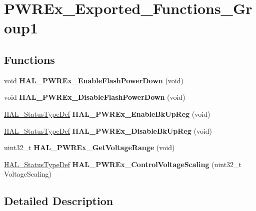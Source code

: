 \hypertarget{group___p_w_r_ex___exported___functions___group1}{}\section{P\+W\+R\+Ex\+\_\+\+Exported\+\_\+\+Functions\+\_\+\+Group1}
\label{group___p_w_r_ex___exported___functions___group1}
\subsection*{Functions}
\begin{DoxyCompactItemize}
\item 
\mbox{\label{group___p_w_r_ex___exported___functions___group1_ga86c72a23f89c3c335ab784f42536b106}} 
void {\bfseries H\+A\+L\+\_\+\+P\+W\+R\+Ex\+\_\+\+Enable\+Flash\+Power\+Down} (void)
\item 
\mbox{\label{group___p_w_r_ex___exported___functions___group1_ga12385932ad48ece7fde94d5c3db5cd19}} 
void {\bfseries H\+A\+L\+\_\+\+P\+W\+R\+Ex\+\_\+\+Disable\+Flash\+Power\+Down} (void)
\item 
\mbox{\label{group___p_w_r_ex___exported___functions___group1_ga21165778ccc2144040c6a935c9f794a7}} 
\hyperlink{stm32f4xx__hal__def_8h_a63c0679d1cb8b8c684fbb0632743478f}{H\+A\+L\+\_\+\+Status\+Type\+Def} {\bfseries H\+A\+L\+\_\+\+P\+W\+R\+Ex\+\_\+\+Enable\+Bk\+Up\+Reg} (void)
\item 
\mbox{\label{group___p_w_r_ex___exported___functions___group1_gae1b50407389e3ce1132eceb013f823d1}} 
\hyperlink{stm32f4xx__hal__def_8h_a63c0679d1cb8b8c684fbb0632743478f}{H\+A\+L\+\_\+\+Status\+Type\+Def} {\bfseries H\+A\+L\+\_\+\+P\+W\+R\+Ex\+\_\+\+Disable\+Bk\+Up\+Reg} (void)
\item 
\mbox{\label{group___p_w_r_ex___exported___functions___group1_ga2978c7160c8d166f1bf2bf39e4bf33f7}} 
uint32\+\_\+t {\bfseries H\+A\+L\+\_\+\+P\+W\+R\+Ex\+\_\+\+Get\+Voltage\+Range} (void)
\item 
\mbox{\label{group___p_w_r_ex___exported___functions___group1_ga1a1e616641c2dc696681ace585d9afb5}} 
\hyperlink{stm32f4xx__hal__def_8h_a63c0679d1cb8b8c684fbb0632743478f}{H\+A\+L\+\_\+\+Status\+Type\+Def} {\bfseries H\+A\+L\+\_\+\+P\+W\+R\+Ex\+\_\+\+Control\+Voltage\+Scaling} (uint32\+\_\+t Voltage\+Scaling)
\end{DoxyCompactItemize}


\subsection{Detailed Description}
